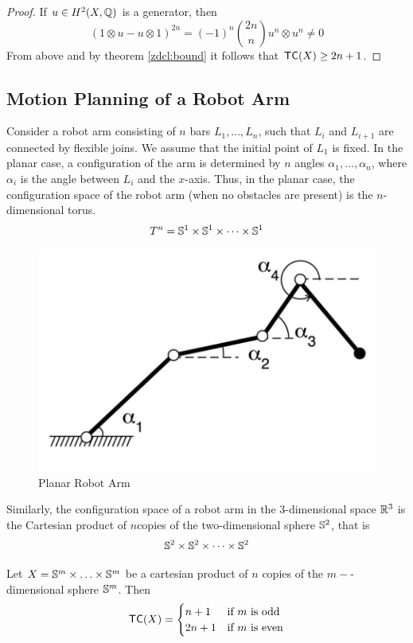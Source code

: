 \begin{proof}
    If $u \in H^2(X, \mathbb{Q})$ is a generator, then
    \[
        (1 \otimes u - u \otimes 1)^{2n} = (-1)^n \binom{2n}{n} u^n \otimes u^n \neq 0
    \]
    From above and by theorem \ref{zdcl:bound} it follows that $\textsf{TC}(X) \ge 2n + 1$.
\end{proof}


\subsection{Motion Planning of a Robot Arm}
Consider a robot arm consisting of $n$ bars $L_1, \ldots, L_n$, such that $L_i$ and $L_{i+1}$ are connected by flexible joins. We assume that the initial point of $L_1$ is fixed. In the planar case, a configuration of the arm is determined by $n$ angles $\alpha_1, \ldots, \alpha_n$, where $\alpha_i$ is the angle between $L_i$ and the $x$-axis. Thus, in the planar case, the configuration space of the robot arm (when no obstacles are present) is the $n$-dimensional torus.
\[
    T^n = \mathbb{S}^1 \times \mathbb{S}^1 \times \cdots \times \mathbb{S}^1
\]

\begin{figure}[h]
    \centering
    \includegraphics[scale=0.5]{images/planar-robot-arm.png}
    \caption{Planar Robot Arm}
\end{figure}

Similarly, the configuration space of a robot arm in the $3$-dimensional space $\mathbb{R}^3$ is the Cartesian product of $n$copies of the two-dimensional sphere $\mathbb{S}^2$, that is
\[
    \mathbb{S}^2 \times \mathbb{S}^2 \times \cdots \times \mathbb{S}^2
\]

\begin{thm}\cite{farber2003topological}
    Let $X  = \mathbb{S}^m \times \ldots \times \mathbb{S}^m$ be a cartesian product of $n$ copies of the $m-$-dimensional sphere $\mathbb{S}^m$. Then
    \[
        \textsf{TC}(X) = \begin{cases}
            n + 1  & \text{if $m$ is odd}  \\
            2n + 1 & \text{if $m$ is even}
        \end{cases}
    \]
\end{thm}

